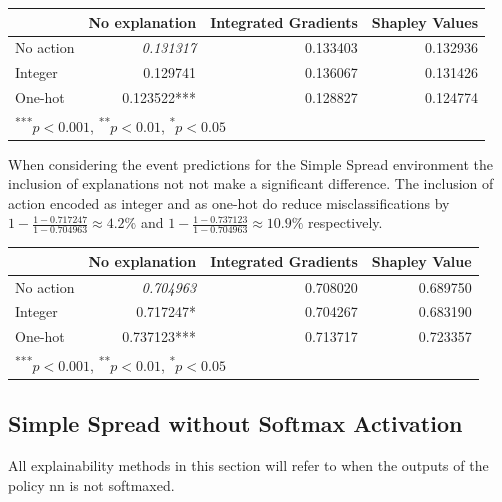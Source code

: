 \documentclass[UKenglish]{uiomasterthesis}
\begin{document}
\begin{center}
\label{tab:state_simpl}
\begin{tabular}{lrrr}
\toprule
& No explanation & Integrated Gradients & Shapley Values \\
\midrule
No action & \textit{0.131317} & 0.133403 & 0.132936 \\
Integer & 0.129741 & 0.136067 & 0.131426 \\
One-hot & 0.123522*** & 0.128827 & 0.124774 \\
\bottomrule
\multicolumn{3}{l}{\textsuperscript{***}$p<0.001$, 
  \textsuperscript{**}$p<0.01$, 
  \textsuperscript{*}$p<0.05$}
\end{tabular}
\end{center}

When considering the event predictions for the Simple Spread environment the inclusion of explanations not not make a significant difference. The inclusion of action encoded as integer and as one-hot do reduce misclassifications by $1-\frac{1-0.717247}{1-0.704963} \approx 4.2\%$ and $1-\frac{1-0.737123}{1-0.704963} \approx 10.9\%$ respectively.

\begin{center}
\label{tab:crit_simpl}
\begin{tabular}{lrrr}
\toprule
 & No explanation & Integrated Gradients & Shapley Value \\
 \midrule
    No action & \textit{0.704963} & 0.708020 & 0.689750 \\
Integer & 0.717247* & 0.704267 & 0.683190 \\
One-hot & 0.737123*** & 0.713717 & 0.723357 \\
\bottomrule
\multicolumn{3}{l}{\textsuperscript{***}$p<0.001$, 
  \textsuperscript{**}$p<0.01$, 
  \textsuperscript{*}$p<0.05$}
\end{tabular}
\end{center}

\subsection{Simple Spread without Softmax Activation}
\label{sec:simpl_no_sm}
All explainability methods in this section will refer to when the outputs of the policy \ac{nn} is not softmaxed.
\end{document}
